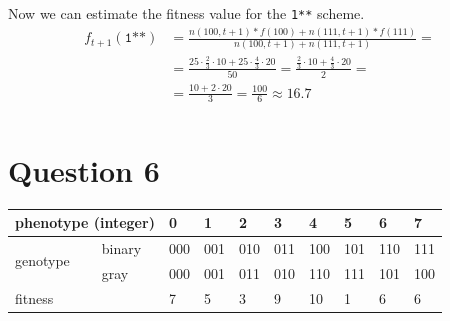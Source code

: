 \documentclass[12pt, a4paper]{article}
\begin{document}
        Now we can estimate the fitness value for the \texttt{1**} scheme.
        \begin{align*}
            f_{t+1}(\texttt{1**}) &= \frac{n(100, t+1) * f(100) + n(111, t+1) * f(111)}{n(100, t+1) + n(111, t+1)} =\\
            &= \frac{25 \cdot \frac{2}{3} \cdot 10 + 25 \cdot \frac{4}{3} \cdot 20}{50}
            = \frac{\frac{2}{3} \cdot 10 + \frac{4}{3} \cdot 20}{2} =\\
            &= \frac{10 + 2 \cdot 20}{3} = \frac{100}{6} \approx 16.7\\
        \end{align*}

    \section{Question 6}
        \begin{table}[H]
        \centering
            \begin{tabular}{|l|l|llllllll|}
            \hline
            \multicolumn{2}{|l|}{phenotype (integer)} & 0   & 1   & 2   & 3   & 4   & 5   & 6   & 7   \\ \hline
            \multirow{2}{*}{genotype}    & binary    & 000 & 001 & 010 & 011 & 100 & 101 & 110 & 111 \\
                                         & gray      & 000 & 001 & 011 & 010 & 110 & 111 & 101 & 100 \\ \hline
            \multicolumn{2}{|l|}{fitness}             & 7   & 5   & 3   & 9   & 10  & 1   & 6   & 6   \\ \hline
            \end{tabular}
        \end{table}
\end{document}
